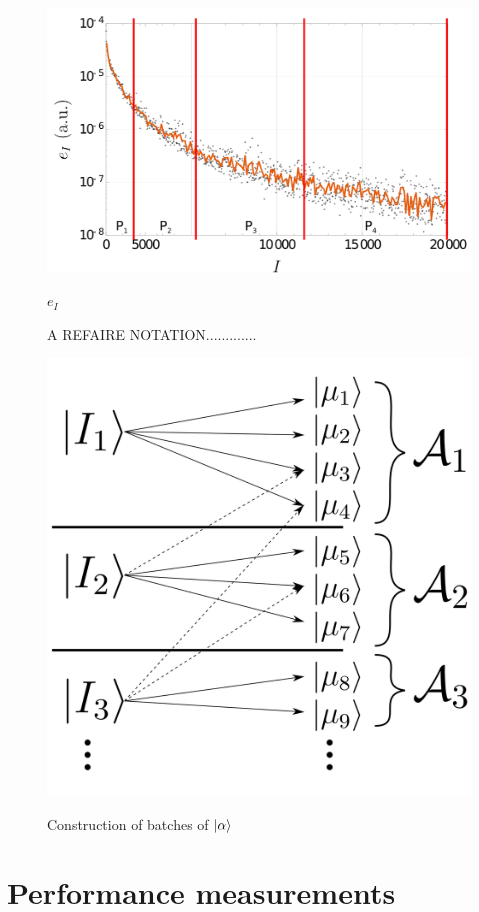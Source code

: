 \documentclass[./thesis.tex]{subfiles}
\begin{document}
\begin{figure}[h!]
	\begin{center}
		\includegraphics[width=0.9\columnwidth]{figures/pt2/P_i}
		\caption{A REFAIRE NOTATION.............}
		\label{fig:p_i}
		$e_I$
	\end{center}
\end{figure}



\begin{figure}[h!]
	\begin{center}
		\includegraphics[width=0.5\columnwidth]{figures/pt2/mu_sample}
		\caption{}
		\label{fig:mu_sample}
		Construction of batches of $\ket \alpha$
	\end{center}
\end{figure}

\clearpage
\section{Performance measurements}
\end{document}
